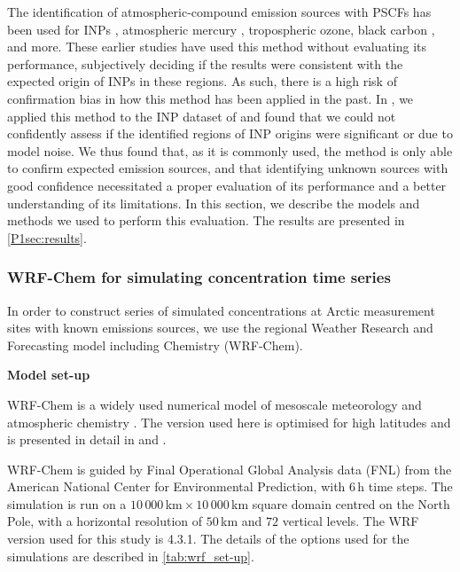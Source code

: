        The identification of atmospheric-compound emission sources with PSCFs has been used for INPs \citep{irish_ice_2019, si_concentrations_2019}, atmospheric mercury \citep{hirdman_transport_2009}, tropospheric ozone, black carbon \citep{hirdman_source_2010}, and more.
       These earlier studies have used this method without evaluating its performance, subjectively deciding if the results were consistent with the expected origin of INPs in these regions. As such, there is a high risk of confirmation bias in how this method has been applied in the past. In \citet{da_silva_identification_2022}, we applied this method to the INP dataset of \citet{wex_annual_2019} and found that we could not confidently assess if the identified regions of INP origins were significant or due to model noise. 
       We thus found that, as it is commonly used, the method is only able to confirm expected emission sources, and that identifying unknown sources with good confidence necessitated a proper evaluation of its performance and a better understanding of its limitations.
       In this section, we describe the models and methods we used to perform this evaluation. The results are presented in \cref{P1sec:results}.
    
    \subsubsection{WRF-Chem for simulating concentration time series}
        \label{P1sec:experiment}

        In order to construct series of simulated concentrations at Arctic measurement sites with known emissions sources, we use the regional {Weather Research and Forecasting model including Chemistry} (WRF-Chem).
    \vspace{\baselineskip}

        \textbf{Model set-up}

            WRF-Chem is a widely used numerical model of mesoscale meteorology and atmospheric chemistry \citep{skamarock_description_2022, grell_fully_2005}.
            The version used here is optimised for high latitudes and is presented in detail in \citet{lapere_modeling_2024} and \citet{marelle_improvements_2017}.

            WRF-Chem is guided by Final Operational Global Analysis data (FNL) from the American {National Center for Environmental Prediction}, with 6\,h time steps.
            The simulation is run on a $10\,000$\,\unit{km}\,$\times $\,$10\,000$\,\unit{km} square domain centred on the North Pole, with a horizontal resolution of $50$\,\unit{km} and $72$ vertical levels.
            The WRF version used for this study is 4.3.1.
           The details of the options used for the simulations are described in \cref{tab:wrf_set-up}.

